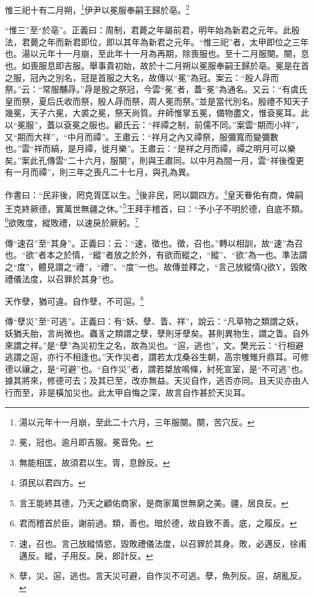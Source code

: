 惟三祀十有二月朔，\footnote{湯以元年十一月崩，至此二十六月，三年服闋。闋，苦穴反。}伊尹以冕服奉嗣王歸於亳。\footnote{冕，冠也。逾月即吉服。冕音免。}

{\noindent\shu{}\fzkt “惟三”至“於亳”。正義曰：周制，君薨之年屬前君，明年始為新君之元年。此殷法，君薨之年而新君即位，即以其年為新君之元年。“惟三祀”者，太甲即位之三年也。湯以元年十一月崩，至此年十一月為再期，除喪服也。至十二月服闋。闋，息也。如喪服息即吉服。舉事貴初始，故於十二月朔以冕服奉嗣王歸於亳。冕是在首之服，冠內之別名，冠是首服之大名，故傳以“冕”為冠。案云：“殷人冔而祭。”云：“常服黼冔。”冔是殷之祭冠，今雲“冕”者，蓋“冕”為通名。又云：“有虞氏皇而祭，夏后氏收而祭，殷人冔而祭，周人冕而祭。”並是當代別名。殷禮不知天子幾冕，天子六冕，大裘之冕，祭天尚質。弁師惟掌五冕，備物盡文，惟袞冕耳。此以“冕服”，蓋以袞冕之服也。顧氏云：“祥禫之制，前儒不同。”案雲“期而小祥”，又“期而大祥”，“中月而禫”。王肅云：“祥月之內又禫祭，服彌寬而變彌數也。”雲“祥而縞，是月禫，徙月樂”。王肅云：“是祥之月而禫，禫之明月可以樂矣。”案此孔傳雲“二十六月，服闋”，則與王肅同。以中月為間一月，雲“祥後復更有一月而禫”，則三年之喪凡二十七月，與孔為異。 \par}

作書曰：“民非後，罔克胥匡以生。\footnote{無能相匡，故須君以生。胥，息餘反。}後非民，罔以闢四方。\footnote{須民以君四方。}皇天眷佑有商，俾嗣王克終厥德，實萬世無疆之休。”\footnote{言王能終其德，乃天之顧佑商家，是商家萬世無窮之美。疆，居良反。}王拜手稽首，曰：“予小子不明於德，自底不類。\footnote{君而稽首於臣，謝前過。類，善也。暗於德，故自致不善。底，之履反。}欲敗度，縱敗禮，以速戾於厥躬。\footnote{速，召也。言己放縱情慾，毀敗禮儀法度，以召罪於其身。敗，必邁反，徐甫邁反。縱，子用反。戾，郎計反。}

{\noindent\zhuan{}\fzbyks 傳“速召”至“其身”。正義曰：云：“速，徵也。徵，召也。”轉以相訓，故“速”為召也。“欲”者本之於情，“縱”者放之於外，有欲而縱之，“縱”、“欲”為一也。準法謂之“度”，體見謂之“禮”，“禮”、“度”一也。故傳並釋之，“言己放縱情Q欲Y，毀敗禮儀法度，以召罪於其身”也。 \par}

天作孽，猶可違。自作孽，不可逭。\footnote{孽，災。逭，逃也。言天災可避，自作災不可逃。孽，魚列反。逭，胡亂反。}

{\noindent\zhuan{}\fzbyks 傳“孽災”至“可逃”。正義曰：有“妖、孽、眚、祥”，說云：“凡草物之類謂之妖，妖猶夭胎，言尚微也。蟲豸之類謂之孽，孽則牙孽矣。甚則異物生，謂之眚。自外來謂之祥。”是“孽”為災初生之名，故為災也。“逭，逃也”，文。樊光云：“行相避逃謂之逭，亦行不相逢也。”天作災者，謂若太戊桑谷生朝，高宗雊雉升鼎耳。可修德以禳之，是“可避”也。“自作災”者，謂若桀放鳴條，紂死宣室，是“不可逃”也。據其將來，修德可去；及其已至，改亦無益。天災自作，逃否亦同。且天災亦由人行而至，非是橫加災也。此太甲自悔之深，故言自作甚於天災耳。 \par}

